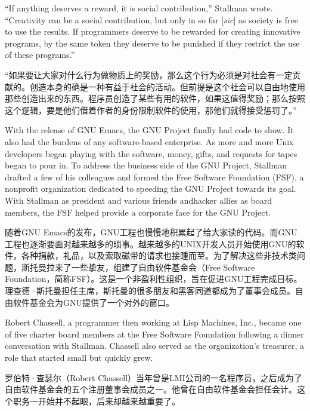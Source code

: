 \ifdefined\eng
``If anything deserves a reward, it is social contribution,'' Stallman wrote. ``Creativity can be a social contribution, but only in so far [\textit{sic}] as society is free to use the results. If programmers deserve to be rewarded for creating innovative programs, by the same token they deserve to be punished if they restrict the use of these programs.''
\fi

\ifdefined\chs
``如果要让大家对什么行为做物质上的奖励，那么这个行为必须是对社会有一定贡献的。创造本身的确是一种有益于社会的活动。但前提是这个社会可以自由地使用那些创造出来的东西。程序员创造了某些有用的软件，如果这值得奖励；那么按照这个逻辑，要是他们借着作者的身份限制软件的使用，那他们就得接受惩罚了。''
\fi

\ifdefined\eng
With the release of GNU Emacs, the GNU Project finally had code to show. It also had the burdens of any software-based enterprise. As more and more Unix developers began playing with the software, money, gifts, and requests for tapes began to pour in. To address the business side of the GNU Project, Stallman drafted a few of his colleagues and formed the Free Software Foundation (FSF), a nonprofit organization dedicated to speeding the GNU Project towards its goal. With Stallman as president and various \ifdefined\vtwo friends and\fi hacker allies as board members, the FSF helped provide a corporate face for the GNU Project.
\fi

\ifdefined\chs
随着GNU Emacs的发布，GNU工程也慢慢地积累起了给大家读的代码。而GNU工程也逐渐要面对越来越多的琐事。越来越多的UNIX开发人员开始使用GNU的软件，各种捐款，礼品，以及索取磁带的请求也接踵而至。为了解决这些非技术类问题，斯托曼拉来了一些挚友，组建了自由软件基金会（Free Software Foundation，简称FSF）。这是一个非盈利性组织，旨在促进GNU工程完成目标。理查德·斯托曼担任主席，斯托曼的很多朋友和黑客同道都成为了董事会成员。自由软件基金会为GNU提供了一个对外的窗口。
\fi

\ifdefined\eng
Robert Chassell, a programmer then working at Lisp Machines, Inc., became one of five charter board members at the Free Software Foundation following a dinner conversation with Stallman. Chassell also served as the organization's treasurer, a role that started small but quickly grew.
\fi

\ifdefined\chs
罗伯特·查瑟尔（Robert Chassell）当年曾是LMI公司的一名程序员，之后成为了自由软件基金会的五个注册董事会成员之一。他曾在自由软件基金会担任会计。这个职务一开始并不起眼，后来却越来越重要了。
\fi


